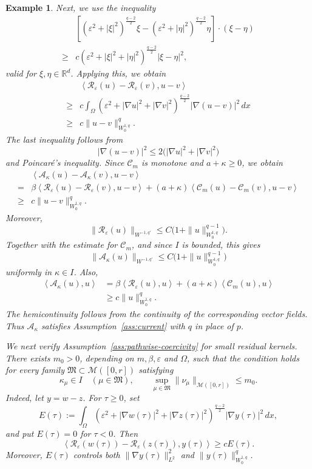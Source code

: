 \documentclass[a4paper,11pt,oneside,reqno]{amsart}
\newtheorem{example}[theorem]{Example}
\newcounter{c}
\newcounter{d}
\newcounter{b}
\newcommand{\R}{\mathbb{R}}
\newcommand{\dual}[2]{\left\langle #1,#2\right\rangle}
\newcommand{\M}{\mathcal{M}}
\newcommand{\KM}{\mathfrak{M}}
\begin{document}
\begin{example}
Next, we use the inequality
\[
\begin{aligned}
&\left[
 (\varepsilon^2+|\xi|^2)^{\frac{q-2}{2}}\xi
 -
 (\varepsilon^2+|\eta|^2)^{\frac{q-2}{2}}\eta
\right]\cdot(\xi-\eta)  \\
\ge{}&
 c(\varepsilon^2+|\xi|^2+|\eta|^2)^{\frac{q-2}{2}}
 |\xi-\eta|^2 ,
\end{aligned}
\]
valid for \(\xi,\eta\in\R^d\). Applying this, we obtain
\[
\begin{aligned}
&\dual{
 \mathcal R_\varepsilon(u)-\mathcal R_\varepsilon(v)
}{u-v}  \\
\ge{}&
 c\int_\Omega
 (\varepsilon^2+|\nabla u|^2+|\nabla v|^2)^{\frac{q-2}{2}}
 |\nabla(u-v)|^2\,dx  \\
\ge{}&
 c\|u-v\|_{W^{1,q}_0}^{q}.
\end{aligned}
\]
The last inequality follows from
\[
 |\nabla(u-v)|^2
 \le
 2\bigl(|\nabla u|^2+|\nabla v|^2\bigr)
\]
and Poincaré's inequality.
Since \(\mathcal C_m\) is monotone and \(a+\kappa\ge0\), we obtain
\[
\begin{aligned}
&\dual{
 \mathcal A_\kappa(u)-\mathcal A_\kappa(v)
}{u-v}  \\
={}&
 \beta\dual{
 \mathcal R_\varepsilon(u)-\mathcal R_\varepsilon(v)
}{u-v}
 +(a+\kappa)
 \dual{
 \mathcal C_m(u)-\mathcal C_m(v)
}{u-v}  \\
\ge{}&
 c\|u-v\|_{W^{1,q}_0}^{q}.
\end{aligned}
\]
Moreover,
\[
 \|\mathcal R_\varepsilon(u)\|_{W^{-1,q'}}
 \le
 C\bigl(1+\|u\|_{W^{1,q}_0}^{q-1}\bigr).
\]
Together with the estimate for \(\mathcal C_m\), and since \(I\) is bounded,
this gives
\[
 \|\mathcal A_\kappa(u)\|_{W^{-1,q'}}
 \le
 C\bigl(1+\|u\|_{W^{1,q}_0}^{q-1}\bigr)
\]
uniformly in \(\kappa\in I\). Also,
\[
\begin{aligned}
 \dual{\mathcal A_\kappa(u)}{u}
 &=
 \beta\dual{\mathcal R_\varepsilon(u)}{u}
 +(a+\kappa)\dual{\mathcal C_m(u)}{u}  \\
 &\ge
 c\|u\|_{W^{1,q}_0}^{q}.
\end{aligned}
\]
The hemicontinuity follows from the continuity of the corresponding vector
fields. Thus \(\mathcal A_\kappa\) satisfies
Assumption~\ref{ass:current} with \(q\) in place of \(p\).

We next verify Assumption~\ref{ass:pathwise-coercivity} for small residual kernels. 
There exists \(m_0>0\), depending on \(m,\beta,\varepsilon\) and
\(\Omega\), such that the condition holds for every family
\(\KM\subset\M([0,r])\) satisfying
\[
 \kappa_\mu\in I\quad(\mu\in\KM),
 \qquad
 \sup_{\mu\in\KM}\|\nu_\mu\|_{\M([0,r])}\le m_0 .
\]
Indeed, let \(y=w-z\). For \(\tau\ge0\), set
\[
 E(\tau):=
 \int_\Omega
 (\varepsilon^2+|\nabla w(\tau)|^2+|\nabla z(\tau)|^2)^{\frac{q-2}{2}}
 |\nabla y(\tau)|^2\,dx ,
\]
and put \(E(\tau)=0\) for \(\tau<0\). Then
\[
 \dual{
 \mathcal R_\varepsilon(w(\tau))
 -\mathcal R_\varepsilon(z(\tau))
 }{y(\tau)}
 \ge cE(\tau).
\]
Moreover, \(E(\tau)\) controls both
\(\|\nabla y(\tau)\|_{L^2}^2\) and
\(\|y(\tau)\|_{W^{1,q}_0}^q\).


\end{example}
\end{document}
